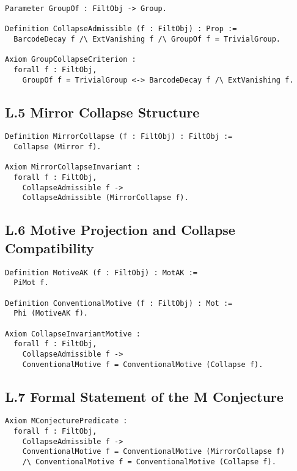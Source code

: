 \documentclass[11pt]{article}
\begin{document}
\begin{lstlisting}[language=Coq, caption=Collapse Admissibility and Group Collapse]
Parameter GroupOf : FiltObj -> Group.

Definition CollapseAdmissible (f : FiltObj) : Prop :=
  BarcodeDecay f /\ ExtVanishing f /\ GroupOf f = TrivialGroup.

Axiom GroupCollapseCriterion :
  forall f : FiltObj,
    GroupOf f = TrivialGroup <-> BarcodeDecay f /\ ExtVanishing f.
\end{lstlisting}

\subsection*{L.5 Mirror Collapse Structure}

\begin{lstlisting}[language=Coq, caption=Mirror Collapse Axiom]
Definition MirrorCollapse (f : FiltObj) : FiltObj :=
  Collapse (Mirror f).

Axiom MirrorCollapseInvariant :
  forall f : FiltObj,
    CollapseAdmissible f ->
    CollapseAdmissible (MirrorCollapse f).
\end{lstlisting}

\subsection*{L.6 Motive Projection and Collapse Compatibility}

\begin{lstlisting}[language=Coq, caption=Motivic Projection Functions]
Definition MotiveAK (f : FiltObj) : MotAK :=
  PiMot f.

Definition ConventionalMotive (f : FiltObj) : Mot :=
  Phi (MotiveAK f).

Axiom CollapseInvariantMotive :
  forall f : FiltObj,
    CollapseAdmissible f ->
    ConventionalMotive f = ConventionalMotive (Collapse f).
\end{lstlisting}

\subsection*{L.7 Formal Statement of the M Conjecture}

\begin{lstlisting}[language=Coq, caption=The M Conjecture (Formal Predicate Statement)]
Axiom MConjecturePredicate :
  forall f : FiltObj,
    CollapseAdmissible f ->
    ConventionalMotive f = ConventionalMotive (MirrorCollapse f)
    /\ ConventionalMotive f = ConventionalMotive (Collapse f).
\end{lstlisting}
\end{document}
